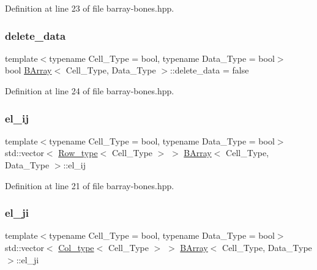 Definition at line 23 of file barray-\/bones.\+hpp.

\mbox{\label{class_b_array_a1e932e3353905d77a2062560ee96b2fc}} 
\subsubsection{\texorpdfstring{delete\+\_\+data}{delete\_data}}
{\footnotesize\ttfamily template$<$typename Cell\+\_\+\+Type = bool, typename Data\+\_\+\+Type = bool$>$ \\
bool \hyperlink{class_b_array}{B\+Array}$<$ Cell\+\_\+\+Type, Data\+\_\+\+Type $>$\+::delete\+\_\+data = false}



Definition at line 24 of file barray-\/bones.\+hpp.

\mbox{\label{class_b_array_a2161dc7c2046a57d3e663ac5c0d70431}} 
\subsubsection{\texorpdfstring{el\+\_\+ij}{el\_ij}}
{\footnotesize\ttfamily template$<$typename Cell\+\_\+\+Type = bool, typename Data\+\_\+\+Type = bool$>$ \\
std\+::vector$<$ \hyperlink{typedefs_8hpp_a83d6ee40a2ba22844108bb8b82e9b951}{Row\+\_\+type}$<$ Cell\+\_\+\+Type $>$ $>$ \hyperlink{class_b_array}{B\+Array}$<$ Cell\+\_\+\+Type, Data\+\_\+\+Type $>$\+::el\+\_\+ij}



Definition at line 21 of file barray-\/bones.\+hpp.

\mbox{\label{class_b_array_aad8ce1aa5fddd3899164c1aa1dfede94}} 
\subsubsection{\texorpdfstring{el\+\_\+ji}{el\_ji}}
{\footnotesize\ttfamily template$<$typename Cell\+\_\+\+Type = bool, typename Data\+\_\+\+Type = bool$>$ \\
std\+::vector$<$ \hyperlink{typedefs_8hpp_a00f3fedec1671706175b572e5c57ee0b}{Col\+\_\+type}$<$ Cell\+\_\+\+Type $>$ $>$ \hyperlink{class_b_array}{B\+Array}$<$ Cell\+\_\+\+Type, Data\+\_\+\+Type $>$\+::el\+\_\+ji}



